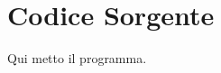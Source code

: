 \clearpage{\pagestyle{empty}\cleardoublepage}
\chapter{Codice Sorgente} 
\label{appendiceWSS} 

Qui metto il programma.
